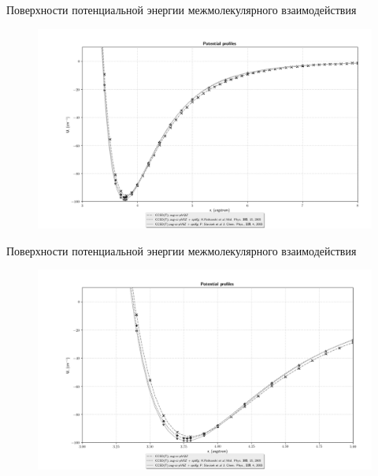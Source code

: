 \documentclass[hyperref={pdfpagelabel=false},usepdftitle=false,xcolor=dvipsnames]{beamer}
\begin{document}
\begin{frame}{\normalsize Поверхности потенциальной энергии межмолекулярного взаимодействия }
\begin{figure}
\vspace*{-0.3cm}
\includegraphics[width = \linewidth]{pictures/pp38.png}
\end{figure}
\end{frame}

\begin{frame}{\normalsize Поверхности потенциальной энергии межмолекулярного взаимодействия }
\begin{figure}
\vspace*{-0.3cm}
\includegraphics[width = \linewidth]{pictures/pp35.png}
\end{figure}
\end{frame}
\end{document}
